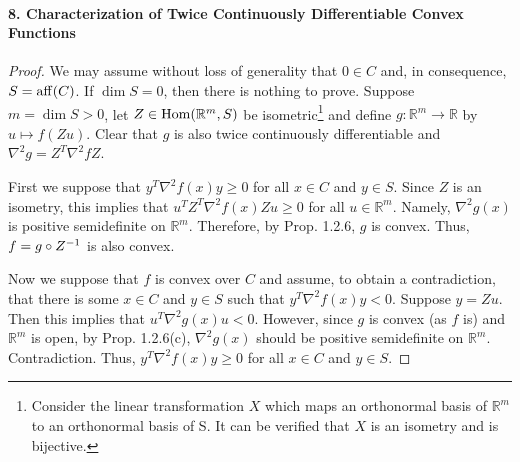   \paragraph{8. Characterization of Twice Continuously Differentiable Convex 
  Functions}
  \begin{proof}
    We may assume without loss of generality that $0\in C$ and, in consequence, 
    $S=\operatorname{aff}(C)$. If $\dim S=0$, then there is nothing to prove. Suppose $m=
    \dim S>0$, let $Z\in\operatorname{Hom}(\mathbb{R}^m,S)$ be isometric\footnote{Consider 
    the linear transformation $X$ which maps an orthonormal basis of 
    $\mathbb{R}^m$ to an orthonormal basis of S. It can be verified that $X$ is 
    an isometry and is bijective.} and define $g:\mathbb{R}^m\to\mathbb{R}$ by 
    $u\mapsto f(Zu)$. Clear that $g$ is also twice continuously differentiable 
    and $\nabla^2g=Z^T\nabla^2f Z$.\par
    First we suppose that $y^T\nabla^2f(x)y\ge 0$ for all $x\in C$ and $y\in 
    S$. Since $Z$ is an isometry, this implies that $u^TZ^T\nabla^2f(x)Zu\ge 
    0$ for all $u\in\mathbb{R}^m$. Namely, $\nabla^2g(x)$ is positive 
    semidefinite on $\mathbb{R}^m$. Therefore, by Prop. 1.2.6, $g$ is convex.
    Thus, $f=g\circ Z^{-1}$ is also convex.\par
    Now we suppose that $f$ is convex over $C$ and assume, to obtain a 
    contradiction, that there is some $x\in C$ and $y\in S$ such that $y^T
    \nabla^2f(x)y<0$. Suppose $y=Zu$. Then this implies that $u^T\nabla^2g(x)u
    <0$. However, since $g$ is convex (as $f$ is) and $\mathbb{R}^m$ is open,
    by Prop. 1.2.6(c), $\nabla^2g(x)$ should be positive semidefinite on
    $\mathbb{R}^m$. Contradiction. Thus, $y^T\nabla^2f(x)y\ge 0$ for all $x\in 
    C$ and $y\in S$.
  \end{proof}
  
